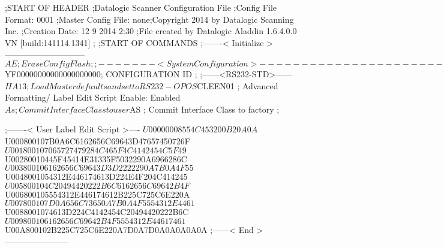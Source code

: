 ;START OF HEADER
;Datalogic Scanner Configuration File
;Config File Format: 0001
;Master Config File: none;Copyright 2014 by Datalogic Scanning Inc.
;Creation Date: 12 9 2014 2:30
;File created by Datalogic Aladdin 1.6.4.0.0 VN [build:141114.1341]
;
;START OF COMMANDS
;-------< Initialize >-----------------------------
$AE                 ; Erase Config Flash
;
;-------< System Configuration >-------------------------------
$YF00000000000000000000; CONFIGURATION ID
;
;------<RS232-STD>------
$HA13               ; Load Master defaults and set to RS232-OPOS
$CLEEN01            ; Advanced Formatting/ Label Edit Script Enable: Enabled
$As                 ; Commit Interface Class to user
$AS                 ; Commit Interface Class to factory
;

;-------< User Label Edit Script >----
$U00000008554C453200B20A0A
$U000800107B0A6C6162656C69643D47657450726F
$U001800107065727479284C465F4C4142454C5F49
$U00280010445F45414E31335F5032290A6966286C
$U003800106162656C69643D3D2222290A7B0A4F55
$U0048001054312E446174613D224E4F204C414245
$U005800104C20494420222B6C6162656C69642B4F
$U006800105554312E446174612B225C725C6E220A
$U007800107D0A656C73650A7B0A4F5554312E4461
$U0088001074613D224C4142454C20494420222B6C
$U009800106162656C69642B4F5554312E44617461
$U00A800102B225C725C6E220A7D0A7D0A0A0A0A0A
;------< End >-----------------------
